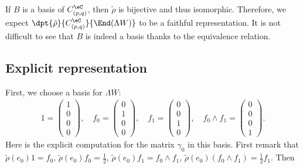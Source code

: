 If $B$ is a basis of $C^{\eC}_{(p,q)}$, then $\tilde\rho$ is bijective and thus isomorphic.  Therefore, we expect $\dpt{\tilde\rho}{C^{\eC}_{(p,q)}}{\End(\Lambda W)}$ to be a faithful representation. It is not difficult to see that $B$ is indeed a basis thanks to the equivalence relation.

\subsection{Explicit representation}

First, we choose a basis for $\Lambda W$:
\begin{eqnarray}\label{102r2} 1=\left(\begin{matrix}
1 \\
0 \\
0 \\
0
\end{matrix}\right),\quad
f_0=\left(\begin{matrix}
0 \\
1 \\
0 \\
0
\end{matrix}\right),\quad
f_1=\left(\begin{matrix}
0 \\
0 \\
1 \\
0
\end{matrix}\right),\quad
f_0\wedge f_1=\left(\begin{matrix}
0 \\
0 \\
0 \\
1
\end{matrix}\right).
\end{eqnarray}
 Here is the explicit computation for the matrix $\gamma_0$ in this basis. First remark that $\tilde\rho(e_0)1=f_0$, $\tilde\rho(e_0)f_0=\frac{1}{2}$, $\tilde\rho(e_0)f_1=f_0\wedge f_1$, $\tilde\rho(e_0)(f_0\wedge f_1)=\frac{1}{2} f_1$. Then
